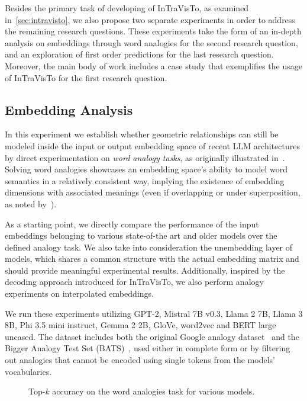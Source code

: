 \documentclass[11pt,a4paper,twocolumn]{article}
\begin{document}
Besides the primary task of developing of InTraVisTo, as examined in~\cref{sec:intravisto}, we also propose two separate experiments in order to address the remaining research questions.
These experiments take the form of an in-depth analysis on embeddings through word analogies for the second research question, and an exploration of first order predictions for the last research question.
Moreover, the main body of work includes a case study that exemplifies the usage of InTraVisTo for the first research question.

\subsection{Embedding Analysis}

In this experiment we establish whether geometric relationships can still be modeled inside the input or output embedding space of recent LLM architectures by direct experimentation on \emph{word analogy tasks}, as originally illustrated in~\citet{mikolov2013}.
Solving word analogies showcases an embedding space's ability to model word semantics in a relatively consistent way, implying the existence of embedding dimensions with associated meanings (even if overlapping or under superposition, as noted by~\citet{elhage2022}).

As a starting point, we directly compare the performance of the input embeddings belonging to various state-of-the art and older models over the defined analogy task.
We also take into consideration the unembedding layer of models, which shares a common structure with the actual embedding matrix and should provide meaningful experimental results.
Additionally, inspired by the decoding approach introduced for InTraVisTo, we also perform analogy experiments on interpolated embeddings.

We run these experiments utilizing GPT-2, Mistral 7B v0.3, Llama 2 7B, Llama 3 8B, Phi 3.5 mini instruct, Gemma 2 2B, GloVe, word2vec and BERT large uncased.
The dataset includes both the original Google analogy dataset~\cite{mikolov2013} and the Bigger Analogy Test Set (BATS)~\cite{drozd2016}, used either in complete form or by filtering out analogies that cannot be encoded using single tokens from the models' vocabularies.

\begin{figure}[h!]
    \centering
    \quad
    \caption{Top-$k$ accuracy on the word analogies task for various models.}
    \label{fig:exp_emb_1_A}
\end{figure}
\end{document}
